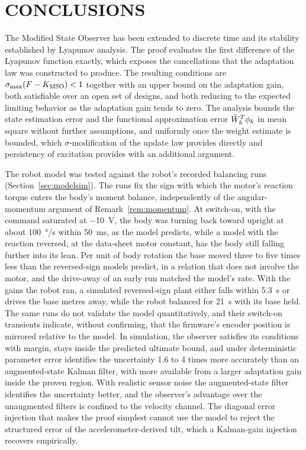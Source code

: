 \chapter{CONCLUSIONS}
\label{ch:conclusions}

The Modified State Observer has been extended to discrete time and its stability
established by Lyapunov analysis. The proof evaluates the first difference
of the Lyapunov function exactly, which exposes the cancellations that the
adaptation law was constructed to produce. The resulting conditions are
$\sigma_{\max}(F-K_{\mathrm{MSO}})<1$ together with an upper bound on the adaptation gain, both
satisfiable over an open set of designs, and both reducing to the expected
limiting behavior as the adaptation gain tends to zero. The analysis bounds the
state estimation error and the functional approximation error
$\tilde{W}_k^T\phi_k$ in mean square without further assumptions, and uniformly once
the weight estimate is bounded, which $\sigma$-modification of the update law
provides directly and persistency of excitation provides with an additional
argument.

The robot model was tested against the robot's recorded balancing runs
(Section~\ref{sec:modelsim}). The runs fix the sign with which the motor's
reaction torque enters the body's moment balance, independently of the
angular-momentum argument of Remark~\ref{rem:momentum}. At switch-on, with the
command saturated at \SI{-10}{V}, the body was turning back toward upright at
about \SI{100}{\degree/s} within \SI{50}{ms}, as the model predicts, while a
model with the reaction reversed, at the data-sheet motor constant, has the body
still falling further into its lean. Per unit of body rotation the base moved
three to five times less than the reversed-sign models predict, in a relation
that does not involve the motor, and the drive-away of an early run matched the
model's rate. With the gains the robot ran, a simulated reversed-sign plant
either falls within \SI{5.3}{s} or drives the base metres away, while the robot
balanced for \SI{21}{s} with its base held. The same runs do not validate the
model quantitatively, and their switch-on transients indicate, without
confirming, that the firmware's encoder position is mirrored relative to the
model. In simulation, the observer satisfies its conditions with margin, stays
inside the predicted ultimate bound, and under deterministic parameter error
identifies the uncertainty 1.6 to 4 times more accurately than an
augmented-state Kalman filter, with more available from a larger adaptation gain
inside the proven region. With realistic sensor noise the augmented-state
filter identifies the uncertainty better, and the observer's advantage over the
unaugmented filters is confined to the velocity channel. The diagonal error
injection that makes the proof simplest cannot use the model to reject the
structured error of the accelerometer-derived tilt, which a Kalman-gain
injection recovers empirically.


